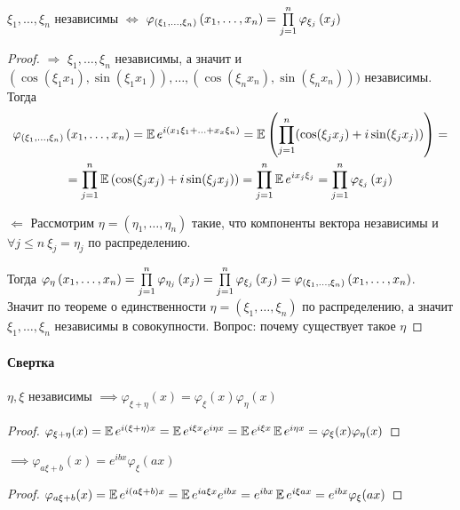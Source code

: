 \begin{theorem}[О независимости]

$\xi_1, \ldots, \xi_n$ независимы $\Longleftrightarrow$ $\varphi_{(\xi_1, \ldots, \xi_n)}\left({x_1, \ldots, x_n}\right) = \prod\limits_{j = 1}^n \varphi_{\xi_j}\left({x_j}\right)$

\end{theorem}

\begin{proof} 
$\Longrightarrow$ 
$\xi_1, \ldots, \xi_n$ независимы, а значит и $(\cos(\xi_1x_1), \sin(\xi_1x_1)), \ldots, (\cos(\xi_nx_n), \sin(\xi_nx_n)))$ независимы. Тогда
\begin{multline*}
    \varphi_{(\xi_1, \ldots, \xi_n)}\left({x_1, \ldots, x_n}\right) = \operatorname{\mathbb{E}} e^{i(x_1\xi_1 + \ldots + x_x\xi_n)} = \operatorname{\mathbb{E}}\left({\prod\limits_{j = 1}^n (\cos(\xi_jx_j) + i\sin(\xi_jx_j))}\right) = \\
    = \prod\limits_{j = 1}^n\operatorname{\mathbb{E}}\left({ \cos(\xi_jx_j) + i\sin(\xi_jx_j)}\right) = \prod\limits_{j = 1}^n \operatorname{\mathbb{E}} e^{ix_j\xi_j} = \prod\limits_{j = 1}^n \varphi_{\xi_j}\left({x_j}\right)
\end{multline*}

$\Longleftarrow$
Рассмотрим $\eta = (\eta_1, \ldots, \eta_n)$ такие, что компоненты вектора независимы и $\forall j \leqslant n \ \xi_j = \eta_j$ по распределению.

Тогда $\varphi_{\eta}\left({x_1, \ldots, x_n}\right) = \prod\limits_{j = 1}^n \varphi_{\eta_j}\left({x_j}\right) = \prod\limits_{j = 1}^n \varphi_{\xi_j}\left({x_j}\right) = \varphi_{(\xi_1, \ldots, \xi_n)}\left({x_1, \ldots, x_n}\right)$. Значит по теореме о единственности $\eta = (\xi_1, \ldots, \xi_n)$ по распределению, а значит $\xi_1, \ldots, \xi_n$ независимы в совокупности. Вопрос: почему существует такое $\eta$\end{proof}

\paragraph*{Свертка}
\begin{statement}
$\eta, \xi$ независимы $\implies \varphi_{\xi + \eta}(x) = \varphi_{\xi}(x)\varphi_{\eta}(x)$
\end{statement}

\begin{proof} $\varphi_{\xi + \eta}(x) = \operatorname{\mathbb{E}} e^{i(\xi + \eta)x} = \operatorname{\mathbb{E}} e^{i\xi x} e^{i \eta x}= \operatorname{\mathbb{E}} e^{i\xi x} \operatorname{\mathbb{E}} e^{i \eta x} = \varphi_{\xi}(x)\varphi_{\eta}(x)$ \end{proof}
\bigskip

\begin{statement}
$\implies \varphi_{a\xi + b}(x) = e^{ibx} \varphi_{\xi}(ax)$
\end{statement}

\begin{proof} $\varphi_{a\xi + b}(x) = \operatorname{\mathbb{E}} e^{i(a\xi + b)x} = \operatorname{\mathbb{E}} e^{ia\xi x} e^{i bx}= e^{i bx} \operatorname{\mathbb{E}} e^{i\xi ax} = e^{ibx} \varphi_{\xi}(ax)$ \end{proof}